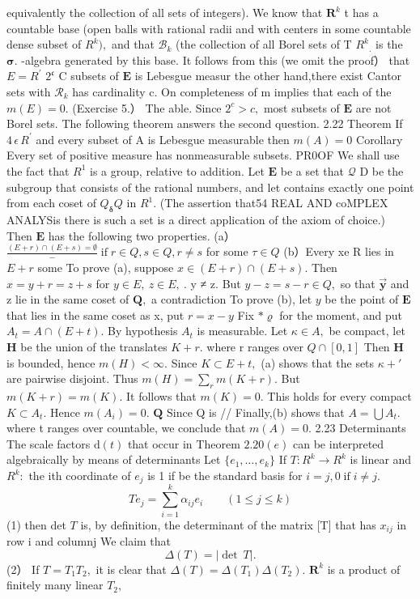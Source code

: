 equivalently the collection of all sets of integers). We know that ${\boldsymbol{R}}^{k}$ t has a countable base (open balls with rational radii and with centers in some countable dense subset of $R^{k}),$ and that ${\mathcal{B}}_{k}$ (the collection of all Borel sets of T $R^{k}{}_{.}$ is the ${\boldsymbol{\sigma}}.$ -algebra generated by this base. It follows from this (we omit the proof） that $E=R^{\prime}$ $2^{\mathfrak{c}}$ C subsets of $\boldsymbol{E}$ is Lebesgue measur the other hand,there exist Cantor sets with ${\mathcal{R}}_{k}$ has cardinality c. On completeness of m implies that each of the $m(E)=0.$ (Exercise 5.） The able. Since $2^{c}>c,$ most subsets of $\boldsymbol{E}$ are not Borel sets. The following theorem answers the second question. 2.22 Theorem If $\scriptstyle4\,\epsilon\,R^{\prime}$ and every subset of A is Lebesgue measurable then $m(A)=0$ Corollary Every set of positive measure has nonmeasurable subsets. PR0OF We shall use the fact that $R^{1}$ is a group, relative to addition. Let $\boldsymbol{E}$ be a set that $\textstyle{\mathcal{Q}}$ D be the subgroup that consists of the rational numbers, and let contains exactly one point from each coset of $Q_{\mathbf{\delta}}Q$ in $R^{1}.$ (The assertion that54 REAL AND coMPLEX ANALYSis there is such a set is a direct application of the axiom of choice.) Then $\boldsymbol{E}$ has the following two properties. (a） ${\frac{(E+r)\cap(E+s)=\emptyset}{-}}\operatorname{if}r\in Q,s\in Q,r\neq s$ for some $\scriptstyle\tau\in Q$ (b）Every xe R lies in $\scriptstyle{E+r}$ some To prove (a), suppose $x\in(E+r)\cap(E+s).$ Then $x=y+r=z+s$ for $y\in E,\ z\in E,\ .$ y ≠ z. But $y-z=s-r\in Q,$ so that $\mathbf{\vec{y}}$ and z lie in the same coset of ${\boldsymbol{Q}},$ a contradiction To prove (b), let $\scriptstyle{y}$ be the point of $\boldsymbol{E}$ that lies in the same coset as x, put $r=x-y$ Fix $\scriptstyle*\varrho$ for the moment, and put $A_{t}=A\cap(E+t).$ By hypothesis $A_{t}$ is measurable. Let $\kappa\in A,$ be compact, let ${\boldsymbol{H}}$ be the union of the translates $K+r.$ where r ranges over $Q\cap[0,1]$ Then ${\boldsymbol{H}}$ is bounded, hence $m(H)<\infty.$ Since $K\subset E+t,$ (a) shows that the sets $\kappa+\prime$ are pairwise disjoint. Thus $m(H)=\sum_{r}m(K+r).$ But $m(K+r)=m(K).$ It follows that $m(K)=0.$ This holds for every compact $K\subset A_{t}.$ Hence $m(A_{i})=0.$ ${\boldsymbol{Q}}$ Since Q is // Finally,(b) shows that $A=\bigcup A_{t}.$ where t ranges over countable, we conclude that $m(A)=0.$ 2.23 Determinants The scale factors ${\mathrm{d}}(t)$ that occur in Theorem $2.20(e)$ can be interpreted algebraically by means of determinants Let $\{e_{1},\ldots,e_{k}\}$ If $T\colon R^{k}\to R^{k}$ is linear and $R^{k}{\mathrm{:}}$ the ith coordinate of $\scriptstyle e_{j}$ is 1 if be the standard basis for $i=j,0\operatorname{if}i\neq j.$ $$ T e_{j}=\sum_{i=1}^{k}\alpha_{i j}e_{i}\qquad(1\leq j\leq k) $$ (1) then det ${\mathbf{}}T$ is, by definition, the determinant of the matrix [T] that has $x_{i j}$ in row i and columnj We claim that $$ \Delta(T)=|\operatorname*{det}\:T|. $$ (2） If $T=T_{1}T_{2},$ it is clear that $\Delta(T)=\Delta(T_{1})\Delta(T_{2}).$ ${\boldsymbol{R}}^{k}$ is a product of finitely many linear $T_{2},$ 